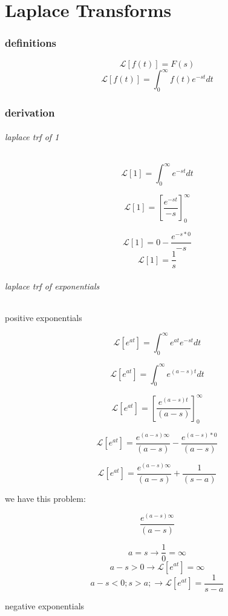 \documentclass[17pt]{extarticle}
\begin{document}
\part{Laplace Transforms}

\section{definitions}

$$\mathcal{L} \left[ f(t) \right] = F(s)$$
$$\mathcal{L} \left[ f(t) \right] = \int_0^\infty f(t) e^{-st} dt$$

\section{derivation}

\paragraph{laplace trf of 1}
$$\mathcal{L} \left[ 1 \right] = \int_0^\infty  e^{-st} dt$$

$$\mathcal{L} \left[ 1 \right] = \left[ \frac{e^{-st}}{-s} \right]_0^\infty$$

$$\mathcal{L} \left[ 1 \right] = 0 -  \frac{e^{-s*0}}{-s}$$
$$\mathcal{L} \left[ 1 \right] =  \frac{1}{s}$$

\paragraph{laplace trf of exponentials}
\subparagraph{positive exponentials}

$$\mathcal{L} \left[ e^{at} \right] = \int_0^\infty e^{at} e^{-st} dt$$

$$\mathcal{L} \left[ e^{at} \right] = \int_0^\infty  e^{(a-s)t} dt$$

$$\mathcal{L} \left[ e^{at} \right] = \left[ \frac{e^{(a-s)t}}{(a-s)}\right]_0^\infty$$

$$\mathcal{L} \left[ e^{at} \right] = \frac{e^{(a-s)\infty}}{(a-s)} - \frac{e^{(a-s)*0}}{(a-s)} $$

$$\mathcal{L} \left[ e^{at} \right] = \frac{e^{(a-s)\infty}}{(a-s)} + \frac{1}{(s-a)} $$

we have this problem:

$$\frac{e^{(a-s)\infty}}{(a-s)}$$


$$a=s \rightarrow \frac{1}{0} = \infty$$
$$a-s >0 \rightarrow \mathcal{L} \left[ e^{at} \right] = \infty$$
$$a-s <0 ; s> a ; \rightarrow \mathcal{L} \left[ e^{at} \right] = \frac{1}{s-a}$$
\subparagraph{negative exponentials}
\end{document}
